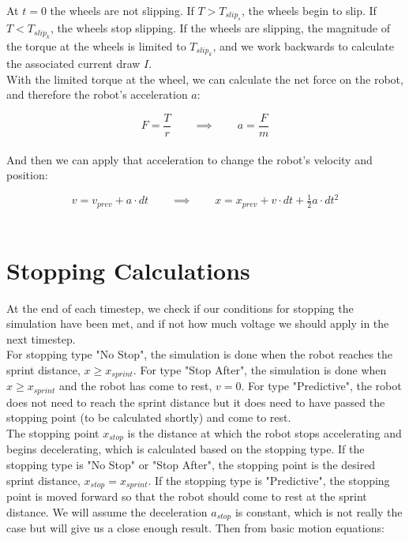 \documentclass[a4paper]{article}
\begin{document}
	At $ t=0 $ the wheels are not slipping. If $ T > T_{slip_s} $, the wheels begin to slip. If $ T < T_{slip_k} $, the wheels stop slipping. If the wheels are slipping, the magnitude of the torque at the wheels is limited to $ T_{slip_k} $, and we work backwards to calculate the associated current draw $ I $.\\
	
	With the limited torque at the wheel, we can calculate the net force on the robot, and therefore the robot's acceleration $ a $:
	
	\begin{equation}
		F = \frac{T}{r} \qquad\implies\qquad a = \frac{F}{m}
	\end{equation}\\
	
	And then we can apply that acceleration to change the robot's velocity and position:
	
	\begin{equation}
		v = v_{prev} + a \cdot dt \qquad\implies\qquad x = x_{prev} + v \cdot dt + \tfrac{1}{2} a \cdot dt^2
	\end{equation}\\
	
	
	\section*{Stopping Calculations}
	
	At the end of each timestep, we check if our conditions for stopping the simulation have been met, and if not how much voltage we should apply in the next timestep.\\
	
	For stopping type "No Stop", the simulation is done when the robot reaches the sprint distance, $ x \geq x_{sprint} $. For type "Stop After", the simulation is done when $ x \geq x_{sprint} $ and the robot has come to rest, $ v = 0 $. For type "Predictive", the robot does not need to reach the sprint distance but it does need to have passed the stopping point (to be calculated shortly) and come to rest.\\
	
	The stopping point $ x_{stop} $ is the distance at which the robot stops accelerating and begins decelerating, which is calculated based on the stopping type. If the stopping type is "No Stop" or "Stop After", the stopping point is the desired sprint distance, $ x_{stop} = x_{sprint} $. If the stopping type is "Predictive", the stopping point is moved forward so that the robot should come to rest at the sprint distance. We will assume the deceleration $ a_{stop} $ is constant, which is not really the case but will give us a close enough result. Then from basic motion equations:
	
\end{document}
